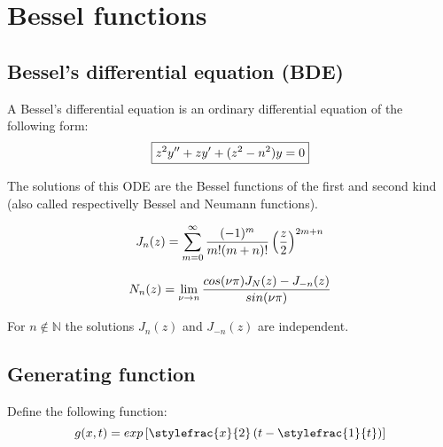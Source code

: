 \chapter{Bessel functions}
\section{Bessel's differential equation (BDE)}

	A Bessel's differential equation is an ordinary differential equation of the following form:
    \begin{equation}\index{Bessel!ordinary differential equation}
        \label{bessel:differential_equation}
		\boxed{z^2y'' + zy' + (z^2 - n^2)y = 0}
    \end{equation}
    
    \noindent The solutions of this ODE are the Bessel functions of the first and second kind (also called respectivelly Bessel and Neumann functions).
    
        
    \begin{equation}\index{Bessel!function}
		\label{bessel:bessel_function}
        J_n(z) = \sum_{m = 0}^\infty\frac{(-1)^m}{m!(m + n)!}\left(\frac{z}{2}\right)^{2m + n}
	\end{equation}
    
    \begin{equation}\index{Neumann!function}
		\label{bessel:neumann_function}
        N_n(z) = \lim_{\nu\rightarrow n}\frac{cos(\nu \pi)J_N(z) - J_{-n}(z)}{sin(\nu\pi)}
	\end{equation}
    
    \begin{property}
		For $n\not\in\mathbb{N}$ the solutions $J_n(z)$ and $J_{-n}(z)$ are independent.
	\end{property}
    
\section{Generating function}
	Define the following function:
    \begin{equation}\index{Bessel!generating function}
		\label{bessel:generating_function}
        g(x, t) = exp\left[\stylefrac{x}{2}\left(t - \stylefrac{1}{t}\right)\right]
	\end{equation}
    
